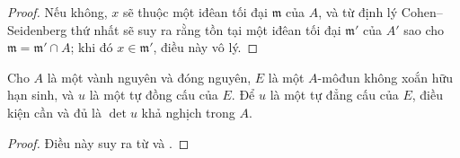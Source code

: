 \documentclass[oneside,10pt]{amsart}
\let\EGAOriginalLabel\label
\renewcommand{\label}[1]{\phantomsection\EGAOriginalLabel{#1}}
\begin{document}
\begin{proof}
Nếu không, $x$ sẽ thuộc một iđêan tối đại $\mathfrak{m}$ của $A$, và từ định lý Cohen--Seidenberg thứ nhất \cite[t.~I, p.~257, th.~3]{I-13} sẽ suy ra rằng tồn tại một iđêan tối đại $\mathfrak{m}'$ của $A'$ sao cho $\mathfrak{m}=\mathfrak{m}'\cap A$;
khi đó $x\in\mathfrak{m}'$, điều này vô lý.
\end{proof}

\begin{corollary}[6.4.6]
\label{II.6.4.6}
Cho $A$ là một vành nguyên và đóng nguyên, $E$ là một $A$-môđun không xoắn hữu hạn sinh, và $u$ là một tự đồng cấu của $E$.
Để $u$ là một tự đẳng cấu của $E$, điều kiện cần và đủ là $\det u$ khả nghịch trong $A$.
\end{corollary}

\begin{proof}
Điều này suy ra từ  và .
\end{proof}
\end{document}
